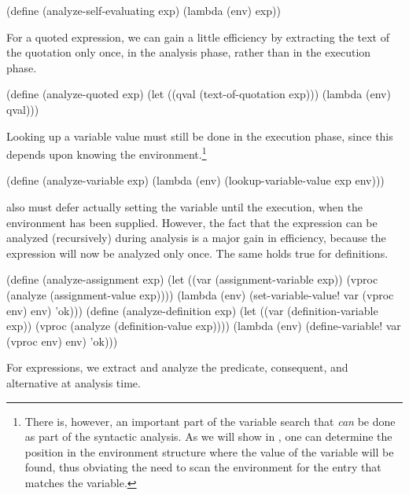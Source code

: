 \begin{codeBlock}
(define (analyze-self-evaluating exp)
  (lambda (env) exp))
\end{codeBlock}

\noindent
For a quoted expression, we can gain a little efficiency by extracting the text
of the quotation only once, in the analysis phase, rather than in the execution
phase.

\begin{codeBlock}
(define (analyze-quoted exp)
  (let ((qval (text-of-quotation exp)))
    (lambda (env) qval)))
\end{codeBlock}

\noindent
Looking up a variable value must still be done in the execution phase, since
this depends upon knowing the environment.\footnote{There is, however, an
important part of the variable search that \emph{can} be done as part of the
syntactic analysis.  As we will show in , one can determine
the position in the environment structure where the value of the variable will
be found, thus obviating the need to scan the environment for the entry that
matches the variable.}

\begin{codeBlock}
(define (analyze-variable exp)
  (lambda (env) (lookup-variable-value exp env)))
\end{codeBlock}

\noindent
{} also must defer actually setting the variable until
the execution, when the environment has been supplied.  However, the fact that
the  expression can be analyzed (recursively) during
analysis is a major gain in efficiency, because the 
expression will now be analyzed only once.  The same holds true for
definitions.

\begin{codeBlock}
(define (analyze-assignment exp)
  (let ((var (assignment-variable exp))
        (vproc (analyze (assignment-value exp))))
    (lambda (env)
      (set-variable-value! var (vproc env) env)
      'ok)))
(define (analyze-definition exp)
  (let ((var (definition-variable exp))
        (vproc (analyze (definition-value exp))))
    (lambda (env)
      (define-variable! var (vproc env) env)
      'ok)))
\end{codeBlock}

\noindent
For  expressions, we extract and analyze the predicate, consequent,
and alternative at analysis time.


